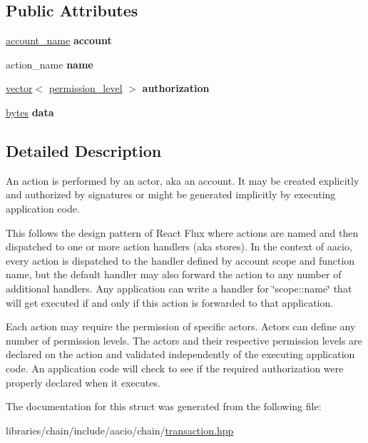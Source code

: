 \subsection*{Public Attributes}
\begin{DoxyCompactItemize}
\item 
\mbox{\label{structaacio_1_1chain_1_1action_a467db613186c546e2c00b8f533536904}} 
\mbox{\hyperlink{structaacio_1_1chain_1_1name}{account\+\_\+name}} {\bfseries account}
\item 
\mbox{\label{structaacio_1_1chain_1_1action_a5586beb5edac202acf4efe5359143b08}} 
action\+\_\+name {\bfseries name}
\item 
\mbox{\label{structaacio_1_1chain_1_1action_ac8a17c3fb9fe4ad3c444a62e503e6b87}} 
\mbox{\hyperlink{classstd_1_1vector}{vector}}$<$ \mbox{\hyperlink{structaacio_1_1chain_1_1permission__level}{permission\+\_\+level}} $>$ {\bfseries authorization}
\item 
\mbox{\label{structaacio_1_1chain_1_1action_aaf6399b1eab23ddeb66b29e28dcef29d}} 
\mbox{\hyperlink{classstd_1_1vector}{bytes}} {\bfseries data}
\end{DoxyCompactItemize}


\subsection{Detailed Description}
An action is performed by an actor, aka an account. It may be created explicitly and authorized by signatures or might be generated implicitly by executing application code.

This follows the design pattern of React Flux where actions are named and then dispatched to one or more action handlers (aka stores). In the context of aacio, every action is dispatched to the handler defined by account \textquotesingle{}scope\textquotesingle{} and function \textquotesingle{}name\textquotesingle{}, but the default handler may also forward the action to any number of additional handlers. Any application can write a handler for \char`\"{}scope\+::name\char`\"{} that will get executed if and only if this action is forwarded to that application.

Each action may require the permission of specific actors. Actors can define any number of permission levels. The actors and their respective permission levels are declared on the action and validated independently of the executing application code. An application code will check to see if the required authorization were properly declared when it executes. 

The documentation for this struct was generated from the following file\+:\begin{DoxyCompactItemize}
\item 
libraries/chain/include/aacio/chain/\mbox{\hyperlink{libraries_2chain_2include_2aacio_2chain_2transaction_8hpp}{transaction.\+hpp}}\end{DoxyCompactItemize}
